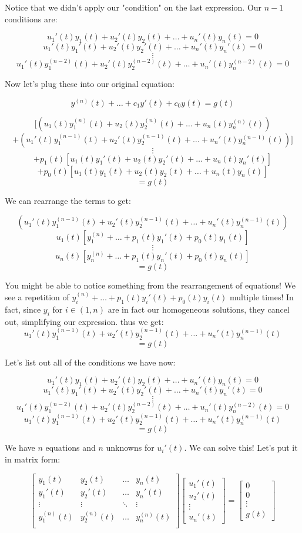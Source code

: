 \documentclass{report}
\begin{document}
{Notice that we didn't apply our "condition" on the last expression. Our $n-1$ conditions are:

$$u_1'(t)y_1(t) + u_2'(t)y_2(t) + \dots + u_n'(t)y_n(t) = 0$$
$$u_1'(t)y_1'(t) + u_2'(t)y_2'(t) + \dots + u_n'(t)y_n'(t) = 0$$
$$\vdots$$
$$u_1'(t)y_1^{(n-2)}(t) + u_2'(t)y_2^{(n-2)}(t) + \dots + u_n'(t)y_n^{(n-2)}(t) = 0$$


Now let's plug these into our original equation:

$$y^{(n)}(t) + \dots + c_1y'(t) + c_0y(t) = g(t)$$

$$[(u_1(t)y_1^{(n)}(t) + u_2(t)y_2^{(n)}(t) + \dots + u_n(t)y_n^{(n)}(t))$$
$$+ (u_1'(t)y_1^{(n-1)}(t) + u_2'(t)y_2^{(n-1)}(t) + \dots + u_n'(t)y_n^{(n-1)}(t))]$$
$$\vdots$$
$$+ p_1(t)[u_1(t)y_1'(t) + u_2(t)y_2'(t) + \dots + u_n(t)y_n'(t)]$$
$$+ p_0(t)[u_1(t)y_1(t) + u_2(t)y_2(t) + \dots + u_n(t)y_n(t)]$$
$$=g(t)$$

We can rearrange the terms to get:

$$(u_1'(t)y_1^{(n-1)}(t) + u_2'(t)y_2^{(n-1)}(t) + \dots + u_n'(t)y_n^{(n-1)}(t))$$
$$u_1(t)[y_1^{(n)} + \dots + p_1(t)y_1'(t) + p_0(t)y_1(t)]$$
$$\vdots$$
$$u_n(t)[y_n^{(n)} + \dots + p_1(t)y_n'(t) + p_0(t)y_n(t)]$$
$$=g(t)$$

You might be able to notice something from the rearrangement of equations! We see a repetition of $y_i^{(n)} + \dots + p_1(t)y_i'(t) + p_0(t)y_i(t)$
multiple times! In fact, since $y_i$ for $i \in (1,n)$ are in fact our homogeneous solutions, they cancel out, simplifying our expression. thus we get:
$$u_1'(t)y_1^{(n-1)}(t) + u_2'(t)y_2^{(n-1)}(t) + \dots + u_n'(t)y_n^{(n-1)}(t)$$
$$=g(t)$$

Let's list out all of the conditions we have now:


$$u_1'(t)y_1(t) + u_2'(t)y_2(t) + \dots + u_n'(t)y_n(t) = 0$$
$$u_1'(t)y_1'(t) + u_2'(t)y_2'(t) + \dots + u_n'(t)y_n'(t) = 0$$
$$\vdots$$
$$u_1'(t)y_1^{(n-2)}(t) + u_2'(t)y_2^{(n-2)}(t) + \dots + u_n'(t)y_n^{(n-2)}(t) = 0$$
$$u_1'(t)y_1^{(n-1)}(t) + u_2'(t)y_2^{(n-1)}(t) + \dots + u_n'(t)y_n^{(n-1)}(t)$$
$$=g(t)$$

We have $n$ equations and $n$ unknowns for $u_i'(t)$. We can solve this! Let's put it in matrix form:

$$
\begin{bmatrix}
    y_1(t) & y_2(t) & \dots  & y_n(t) \\
    y_1'(t) & y_2'(t) & \dots  & y_n'(t) \\
    \vdots & \vdots & \ddots & \vdots \\
    y_1^{(n)}(t) & y_2^{(n)}(t) & \dots  & y_n^{(n)}(t) \\
    \end{bmatrix}
\begin{bmatrix}
    u_1'(t) \\
    u_2'(t) \\
    \vdots \\ 
    u_n'(t)
\end{bmatrix}
=
\begin{bmatrix}
    0 \\
    0 \\
    \vdots \\ 
    g(t)
\end{bmatrix}
$$


}
\end{document}
